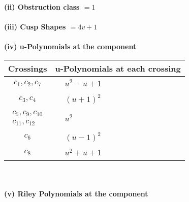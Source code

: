 \documentclass[1p]{elsarticle_modified}
\theoremstyle{definition}
\begin{document}
\flushleft \textbf{(ii) Obstruction class $= 1$}\\~\\
\flushleft \textbf{(iii) Cusp Shapes $= 4 v+1$}\\~\\
\newpage\renewcommand{\arraystretch}{1}
\flushleft \textbf{(iv) u-Polynomials at the component}\newline \\
\begin{tabular}{m{50pt}|m{274pt}}
Crossings & \hspace{64pt}u-Polynomials at each crossing \\
\hline $$\begin{aligned}c_{1},c_{2},c_{7}\end{aligned}$$&$\begin{aligned}
&u^2- u+1
\end{aligned}$\\
\hline $$\begin{aligned}c_{3},c_{4}\end{aligned}$$&$\begin{aligned}
&(u+1)^2
\end{aligned}$\\
\hline $$\begin{aligned}c_{5},c_{9},c_{10}\\c_{11},c_{12}\end{aligned}$$&$\begin{aligned}
&u^2
\end{aligned}$\\
\hline $$\begin{aligned}c_{6}\end{aligned}$$&$\begin{aligned}
&(u-1)^2
\end{aligned}$\\
\hline $$\begin{aligned}c_{8}\end{aligned}$$&$\begin{aligned}
&u^2+u+1
\end{aligned}$\\
\hline
\end{tabular}\\~\\
\newpage\renewcommand{\arraystretch}{1}
\flushleft \textbf{(v) Riley Polynomials at the component}\newline \\
\end{document}
